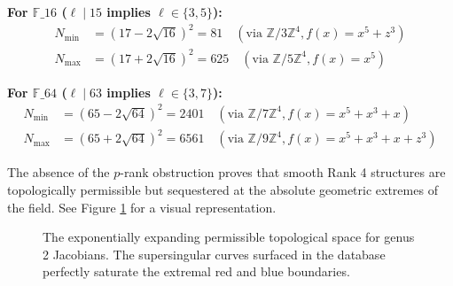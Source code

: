 \documentclass[letterpaper, 11pt]{article}
\begin{document}
\textbf{For $\mathbb{F}\_{16}$ ($\ell \mid 15$ implies $\ell \in \{3, 5\}$):}
\begin{align*}
    N_{\text{min}} &= (17 - 2\sqrt{16})^2 = 81 \quad (\text{via } \mathbb{Z}/3\mathbb{Z}^4, f(x) = x^5 + z^3) \\
    N_{\text{max}} &= (17 + 2\sqrt{16})^2 = 625 \quad (\text{via } \mathbb{Z}/5\mathbb{Z}^4, f(x) = x^5)
\end{align*}

\textbf{For $\mathbb{F}\_{64}$ ($\ell \mid 63$ implies $\ell \in \{3, 7\}$):}
\begin{align*}
    N_{\text{min}} &= (65 - 2\sqrt{64})^2 = 2401 \quad (\text{via } \mathbb{Z}/7\mathbb{Z}^4, f(x) = x^5 + x^3 + x) \\
    N_{\text{max}} &= (65 + 2\sqrt{64})^2 = 6561 \quad (\text{via } \mathbb{Z}/9\mathbb{Z}^4, f(x) = x^5 + x^3 + x + z^3)
\end{align*}

The absence of the $p$-rank obstruction proves that smooth Rank 4 structures are topologically permissible but sequestered at the absolute geometric extremes of the field. See Figure \ref{fig:hasse_weil_bounds} for a visual representation.

\begin{figure}[htpb]
    \centering
    \caption{The exponentially expanding permissible topological space for genus 2 Jacobians. The supersingular curves surfaced in the database perfectly saturate the extremal red and blue boundaries.}
    \label{fig:hasse_weil_bounds}
\end{figure}
\end{document}
